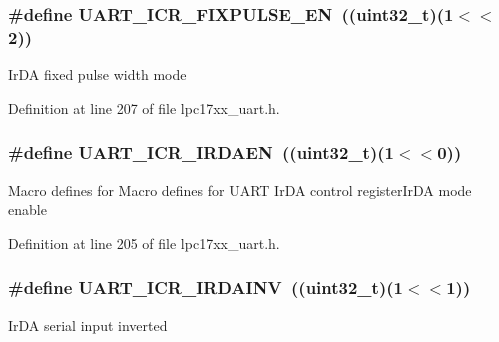 \subsubsection[{\texorpdfstring{U\+A\+R\+T\+\_\+\+I\+C\+R\+\_\+\+F\+I\+X\+P\+U\+L\+S\+E\+\_\+\+EN}{UART_ICR_FIXPULSE_EN}}]{\setlength{\rightskip}{0pt plus 5cm}\#define U\+A\+R\+T\+\_\+\+I\+C\+R\+\_\+\+F\+I\+X\+P\+U\+L\+S\+E\+\_\+\+EN~(({\bf uint32\+\_\+t})(1$<$$<$2))}\hypertarget{group___u_a_r_t___private___macros_gae022dc3e5ad94f95d2805294d97594cd}{}\label{group___u_a_r_t___private___macros_gae022dc3e5ad94f95d2805294d97594cd}
Ir\+DA fixed pulse width mode 

Definition at line 207 of file lpc17xx\+\_\+uart.\+h.

\subsubsection[{\texorpdfstring{U\+A\+R\+T\+\_\+\+I\+C\+R\+\_\+\+I\+R\+D\+A\+EN}{UART_ICR_IRDAEN}}]{\setlength{\rightskip}{0pt plus 5cm}\#define U\+A\+R\+T\+\_\+\+I\+C\+R\+\_\+\+I\+R\+D\+A\+EN~(({\bf uint32\+\_\+t})(1$<$$<$0))}\hypertarget{group___u_a_r_t___private___macros_ga716e4830450b44e4f290e6c99879ba99}{}\label{group___u_a_r_t___private___macros_ga716e4830450b44e4f290e6c99879ba99}
Macro defines for Macro defines for U\+A\+RT Ir\+DA control register\+Ir\+DA mode enable 

Definition at line 205 of file lpc17xx\+\_\+uart.\+h.

\subsubsection[{\texorpdfstring{U\+A\+R\+T\+\_\+\+I\+C\+R\+\_\+\+I\+R\+D\+A\+I\+NV}{UART_ICR_IRDAINV}}]{\setlength{\rightskip}{0pt plus 5cm}\#define U\+A\+R\+T\+\_\+\+I\+C\+R\+\_\+\+I\+R\+D\+A\+I\+NV~(({\bf uint32\+\_\+t})(1$<$$<$1))}\hypertarget{group___u_a_r_t___private___macros_gabee5ba619dd3c8f28a7d2ec488614f06}{}\label{group___u_a_r_t___private___macros_gabee5ba619dd3c8f28a7d2ec488614f06}
Ir\+DA serial input inverted 

